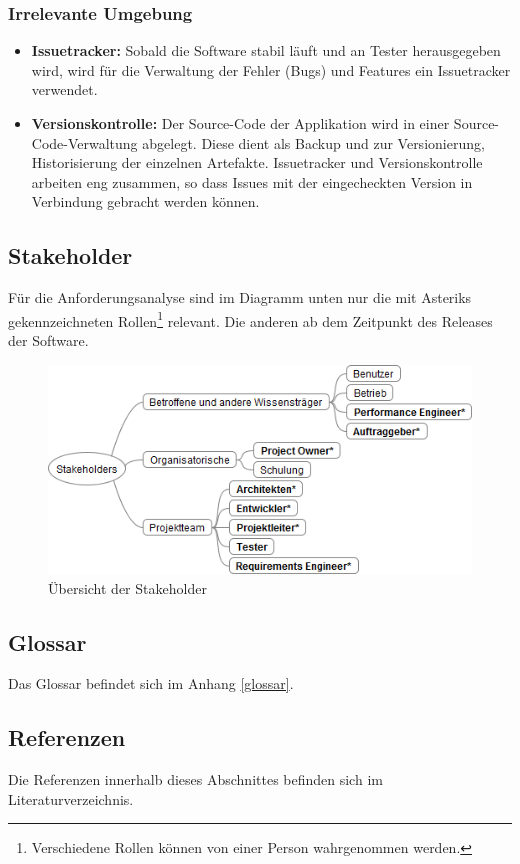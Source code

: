 \subsubsection{Irrelevante Umgebung}
\begin{itemize}
	\item \textbf{Issuetracker:} Sobald die Software stabil läuft und an Tester herausgegeben wird, wird für die Verwaltung der Fehler (Bugs) und Features ein Issuetracker verwendet.
	\item \textbf{Versionskontrolle:} Der Source-Code der Applikation wird in einer Source-Code-Verwaltung abgelegt. Diese dient als Backup und zur Versionierung, Historisierung der einzelnen Artefakte. Issuetracker und Versionskontrolle arbeiten eng zusammen, so dass Issues mit der eingecheckten Version in Verbindung gebracht werden können.
\end{itemize}


\subsection{Stakeholder}
Für die Anforderungsanalyse sind im Diagramm unten nur die mit Asteriks gekennzeichneten Rollen\footnote{Verschiedene Rollen können von einer Person wahrgenommen werden.} relevant. Die anderen ab dem Zeitpunkt des Releases der Software.


\begin{figure}[H]
  	\centering
    	\includegraphics[width=13cm]{images/stakeholder_analyse}
        	\caption{Übersicht der Stakeholder}
\end{figure}

\subsection{Glossar}
Das Glossar befindet sich im Anhang \ref{glossar}. 
\subsection{Referenzen}
Die Referenzen innerhalb dieses Abschnittes befinden sich im Literaturverzeichnis.
